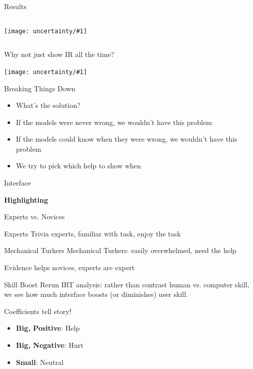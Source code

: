 \documentclass[compress]{beamer}
\newcommand{\fsi}[2]{
\begin{frame}[plain]
\vspace*{-1pt}
\makebox[\linewidth]{\texttt{[image: \#1]}}
\begin{center}
#2
\end{center}
\end{frame}
}
\newcommand{\gfxu}[2]{
	\begin{center}
		\texttt{[image: uncertainty/\#1]}
	\end{center}
}
\newif\iflong\longfalse
\begin{document}
\begin{frame}{Results}
	\begin{columns}
		\gfxu{acc_correct}{1.0}
		\only<2>{\gfxu{acc_wrong}{1.0}}
	\end{columns}
\end{frame}

\begin{frame}{Why not just show IR all the time?}
	\pause
	\gfxu{time}{.5}
\end{frame}

\begin{frame}{Breaking Things Down}
	\begin{itemize}
		\item What's the solution?
		\item If the models were never wrong, we wouldn't have this problem
		\item If the models could know when they were wrong, we wouldn't have this problem
		\item \alert<2->{We try to pick which help to show when}
	\end{itemize} 
	
\end{frame}


\fsi{qb/augment/screenshot_all}{Interface}

\fsi{qb/augment/screenshot_guesses}{}

\fsi{qb/augment/screenshot_highlight}{{\bf Highlighting}}

\fsi{qb/augment/screenshot_evidence}{}

\begin{frame}{Experts vs. Novices}
	
	\begin{block}{Experts}
		Trivia experts, familiar with task, enjoy the task
	\end{block}
	
	\begin{block}{Mechanical Turkers}
		Mechanical Turkers: easily overwhelmed, need the help
	\end{block}
	
\end{frame}

\fsi{qb/augment/tools_acc}{Evidence helps novices, experts are expert}

\iflong

\begin{frame}{Skill Boost}
	Rerun IRT analysis: rather than contrast human vs. computer skill,
	we see how much interface boosts (or diminishes) user skill.
	\pause
	
	\begin{block}{Coefficients tell story!}
		\begin{itemize}
			\item {\bf Big, Positive}: Help
			\item {\bf Big, Negative}: Hurt
			\item {\bf Small}: Neutral
		\end{itemize}
	\end{block}
	
\end{frame}
\end{document}
